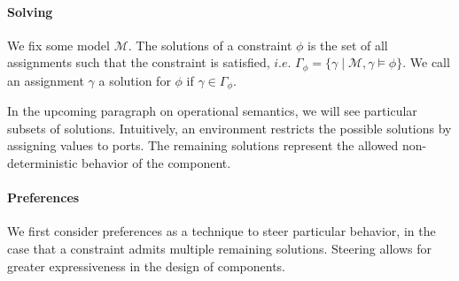 \paragraph{Solving} 
We fix some model $\mathcal{M}$.
The solutions of a constraint $\phi$ is the set of all assignments such that the constraint is satisfied,
$i.e.$ $\Gamma_{\phi} = \{ \gamma \mid \mathcal{M},\gamma \models \phi \}$.
We call an assignment $\gamma$ a solution for $\phi$ if $\gamma\in\Gamma_{\phi}$.

In the upcoming paragraph on operational semantics, we will see particular subsets of solutions.
Intuitively, an environment restricts the possible solutions by assigning values to ports.
The remaining solutions represent the allowed non-deterministic behavior of the component.





\paragraph{Preferences} 
We first consider preferences as a technique to steer particular behavior,
in the case that a constraint admits multiple remaining solutions.
Steering allows for greater expressiveness in the design of components.

